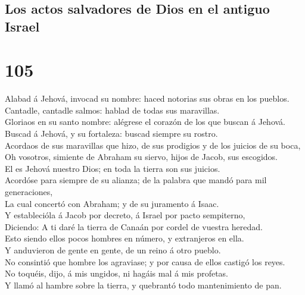 \hypertarget{los-actos-salvadores-de-dios-en-el-antiguo-israel}{%
\subsection{Los actos salvadores de Dios en el antiguo
Israel}\label{los-actos-salvadores-de-dios-en-el-antiguo-israel}}

\hypertarget{section-104}{%
\section{105}\label{section-104}}

 Alabad á Jehová, invocad su nombre: haced notorias sus
obras en los pueblos.\\
 Cantadle, cantadle salmos: hablad de todas sus
maravillas.\\
 Gloriaos en su santo nombre: alégrese el corazón de los que
buscan á Jehová.\\
 Buscad á Jehová, y su fortaleza: buscad siempre su
rostro.\\
 Acordaos de sus maravillas que hizo, de sus prodigios y de
los juicios de su boca,\\
 Oh vosotros, simiente de Abraham su siervo, hijos de Jacob,
sus escogidos.\\
 El es Jehová nuestro Dios; en toda la tierra son sus
juicios.\\
 Acordóse para siempre de su alianza; de la palabra que
mandó para mil generaciones,\\
 La cual concertó con Abraham; y de su juramento á Isaac.\\
 Y establecióla á Jacob por decreto, á Israel por pacto
sempiterno,\\
 Diciendo: A ti daré la tierra de Canaán por cordel de
vuestra heredad.\\
 Esto siendo ellos pocos hombres en número, y extranjeros
en ella.\\
 Y anduvieron de gente en gente, de un reino á otro
pueblo.\\
 No consintió que hombre los agraviase; y por causa de
ellos castigó los reyes.\\
 No toquéis, dijo, á mis ungidos, ni hagáis mal á mis
profetas.\\
 Y llamó al hambre sobre la tierra, y quebrantó todo
mantenimiento de pan.\\
